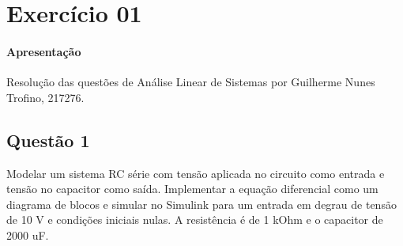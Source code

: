 \documentclass{article}
\begin{document}
    \section{Exercício 01}
        \paragraph{Apresentação}Resolução das questões de Análise Linear de Sistemas por Guilherme Nunes Trofino, 217276.

        \subsection{Questão 1}
            \begin{exercise}
                Modelar um sistema RC série com tensão aplicada no circuito como entrada e tensão no capacitor como saída. Implementar a equação diferencial como um diagrama de blocos e simular no Simulink para um entrada em degrau de tensão de 10 V e condições iniciais nulas. A resistência é de 1 kOhm e o capacitor de 2000 uF.
            \end{exercise}
\end{document}
